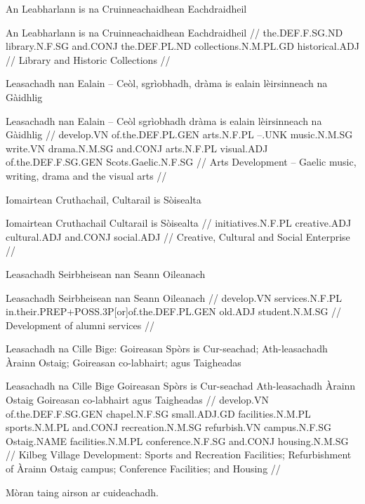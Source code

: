 \documentclass[a4paper,10pt]{article}
\begin{document}
\ex
\begingl
\glpre An Leabharlann is na Cruinneachaidhean Eachdraidheil 

\vspace{4mm}
\gla An Leabharlann is na Cruinneachaidhean Eachdraidheil  //
\glb the.DEF.F.SG.ND library.N.F.SG and.CONJ the.DEF.PL.ND collections.N.M.PL.GD historical.ADJ  //
\glft Library and Historic Collections //
\endgl
\xe

\ex
\begingl
\glpre Leasachadh nan Ealain – Ceòl, sgrìobhadh, dràma is ealain lèirsinneach na Gàidhlig 

\vspace{4mm}
\gla Leasachadh nan Ealain – Ceòl sgrìobhadh dràma is ealain lèirsinneach na Gàidhlig  //
\glb develop.VN of.the.DEF.PL.GEN arts.N.F.PL –.UNK music.N.M.SG write.VN drama.N.M.SG and.CONJ arts.N.F.PL visual.ADJ of.the.DEF.F.SG.GEN Scots.Gaelic.N.F.SG  //
\glft Arts Development – Gaelic music, writing, drama and the visual arts //
\endgl
\xe

\ex
\begingl
\glpre Iomairtean Cruthachail, Cultarail is Sòisealta 

\vspace{4mm}
\gla Iomairtean Cruthachail Cultarail is Sòisealta  //
\glb initiatives.N.F.PL creative.ADJ cultural.ADJ and.CONJ social.ADJ  //
\glft Creative, Cultural and Social Enterprise //
\endgl
\xe

\ex
\begingl
\glpre Leasachadh Seirbheisean nan Seann Oileanach 

\vspace{4mm}
\gla Leasachadh Seirbheisean nan Seann Oileanach  //
\glb develop.VN services.N.F.PL in.their.PREP+POSS.3P[or]of.the.DEF.PL.GEN old.ADJ student.N.M.SG  //
\glft Development of alumni services //
\endgl
\xe

\ex
\begingl
\glpre Leasachadh na Cille Bige: Goireasan Spòrs is Cur-seachad; Ath-leasachadh Àrainn Ostaig; Goireasan co-labhairt; agus Taigheadas 

\vspace{4mm}
\gla Leasachadh na Cille Bige Goireasan Spòrs is Cur-seachad Ath-leasachadh Àrainn Ostaig Goireasan co-labhairt agus Taigheadas  //
\glb develop.VN of.the.DEF.F.SG.GEN chapel.N.F.SG small.ADJ.GD facilities.N.M.PL sports.N.M.PL and.CONJ recreation.N.M.SG refurbish.VN campus.N.F.SG Ostaig.NAME facilities.N.M.PL conference.N.F.SG and.CONJ housing.N.M.SG  //
\glft Kilbeg Village Development: Sports and Recreation Facilities; Refurbishment of Àrainn Ostaig campus; Conference Facilities; and Housing //
\endgl
\xe

\ex
\begingl
\glpre Mòran taing airson ar cuideachadh. 
\end{document}
